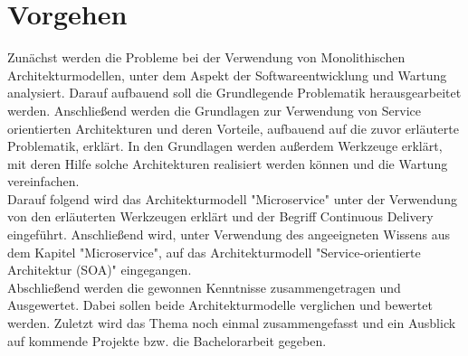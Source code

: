 \section{Vorgehen}
\label{sec:vorgehen}
Zunächst werden die Probleme bei der Verwendung von Monolithischen Architekturmodellen, unter dem Aspekt der Softwareentwicklung und Wartung analysiert. Darauf aufbauend soll die Grundlegende Problematik herausgearbeitet werden. Anschließend werden die Grundlagen zur Verwendung von Service orientierten Architekturen und deren Vorteile, aufbauend auf die zuvor erläuterte Problematik, erklärt. In den Grundlagen werden außerdem Werkzeuge erklärt, mit deren Hilfe solche Architekturen realisiert werden können und die Wartung vereinfachen.
\\
Darauf folgend wird das Architekturmodell "Microservice" unter der Verwendung von den erläuterten Werkzeugen erklärt und der Begriff Continuous Delivery eingeführt. Anschließend wird, unter Verwendung des angeeigneten Wissens aus dem Kapitel "Microservice", auf das Architekturmodell "Service-orientierte Architektur (SOA)" eingegangen.
\\
Abschließend werden die gewonnen Kenntnisse zusammengetragen und Ausgewertet. Dabei sollen beide Architekturmodelle verglichen und bewertet werden. Zuletzt wird das Thema noch einmal zusammengefasst und ein Ausblick auf kommende Projekte bzw. die Bachelorarbeit gegeben.